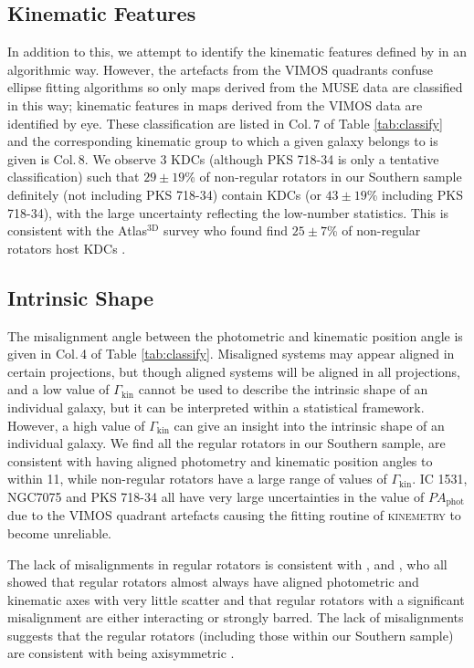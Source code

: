 \documentclass[a4paper,fleqn,usenatbib]{mnras}
\begin{document}
	\subsection{Kinematic Features}
		In addition to this, we attempt to identify the kinematic features defined by \citet{Krajnovic2011} in an algorithmic way. However, the artefacts from the VIMOS quadrants confuse ellipse fitting algorithms so only maps derived from the MUSE data are classified in this way; kinematic features in maps derived from the VIMOS data are identified by eye. These classification are listed in Col.\,7 of Table \ref{tab:classify} and the corresponding kinematic group to which a given galaxy belongs to is given is Col.\,8. We observe 3 KDCs (although PKS 718-34 is only a tentative classification) such that $29\pm19$\% of non-regular rotators in our Southern sample definitely (not including PKS 718-34) contain KDCs (or $43\pm19$\% including PKS 718-34), with the large uncertainty reflecting the low-number statistics. This is consistent with the Atlas$^\text{3D}$ survey who found find $25\pm7$\% of non-regular rotators host KDCs \citep{Krajnovic2011}.


	\subsection{Intrinsic Shape}
		The misalignment angle between the photometric and kinematic position angle is given in Col.\,4 of Table \ref{tab:classify}. Misaligned systems may appear aligned in certain projections, but though aligned systems will be aligned in all projections, and a low value of $\Gamma_\text{kin}$ cannot be used to describe the intrinsic shape of an individual galaxy, but it can be interpreted within a statistical framework. However, a high value of $\Gamma_\text{kin}$ can give an insight into the intrinsic shape of an individual galaxy. We find all the regular rotators in our Southern sample, are consistent with having aligned photometry and kinematic position angles to within 11\degr, while non-regular rotators have a large range of values of $\Gamma_\text{kin}$. IC 1531, NGC7075 and PKS 718-34 all have very large uncertainties in the value of $PA_\text{phot}$ due to the VIMOS quadrant artefacts causing the fitting routine of \textsc{kinemetry} to become unreliable. 

		The lack of misalignments in regular rotators is consistent with \citet{Cappellari2007}, \citet{Krajnovic2011} and \citet{Fogarty2015}, who all showed that regular rotators almost always have aligned photometric and kinematic axes with very little scatter and that regular rotators with a significant misalignment are either interacting or strongly barred. The lack of misalignments suggests that the regular rotators (including those within our Southern sample) are consistent with being axisymmetric \citep{Cappellari2016}.
\end{document}
